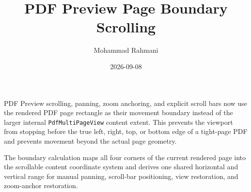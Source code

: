 \documentclass[a4paper]{article}
\title{PDF Preview Page Boundary Scrolling}
\date{2026-09-08}
\author{Mohammad Rahmani}
\begin{document}
   \maketitle

   PDF Preview scrolling, panning, zoom anchoring, and explicit scroll bars now use the rendered PDF page rectangle as their movement boundary instead of the larger internal \texttt{PdfMultiPageView} content extent. This prevents the viewport from stopping before the true left, right, top, or bottom edge of a tight-page PDF and prevents movement beyond the actual page geometry.

   The boundary calculation maps all four corners of the current rendered page into the scrollable content coordinate system and derives one shared horizontal and vertical range for manual panning, scroll-bar positioning, view restoration, and zoom-anchor restoration.

   
   
\end{document}
